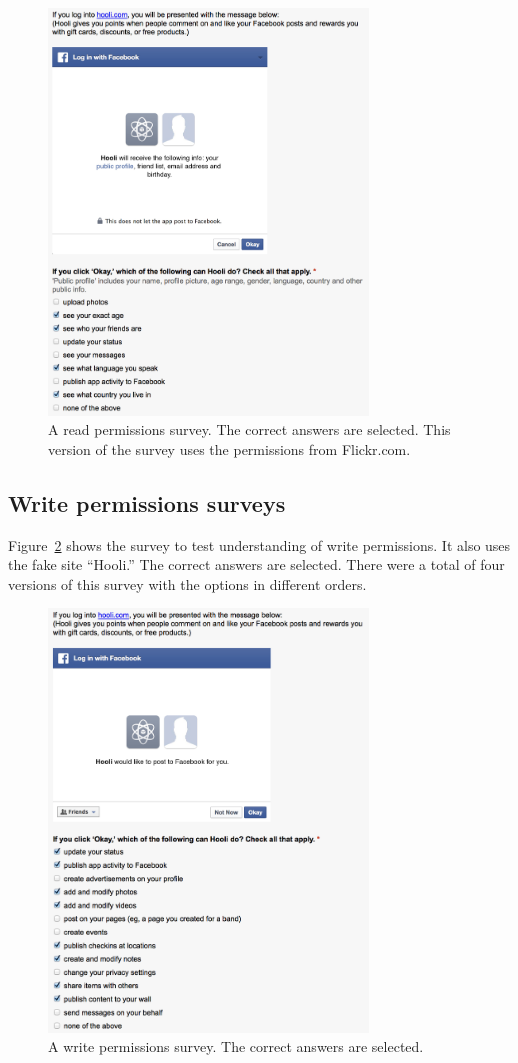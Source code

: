 \documentclass[10pt]{sig-alternate-10pt}
\begin{document}
\begin{figure}[h!]
  \centering
  \includegraphics[width=8.5cm]{64r}
  \caption{A read permissions survey. The correct answers are selected. This version of the survey uses the permissions from Flickr.com.}
  \label{figure:64r}
\end{figure}


\subsection{Write permissions surveys}
\label{appendix:writesurveys}

Figure~\ref{figure:61w} shows the survey to test understanding of write permissions. It also uses the fake site ``Hooli.'' The correct answers are selected. There were a total of four versions of this survey with the options in different orders.

\begin{figure}[h!]
  \centering
  \includegraphics[width=8.5cm]{61w}
  \caption{A write permissions survey. The correct answers are selected.}
  \label{figure:61w}
\end{figure}
\end{document}
